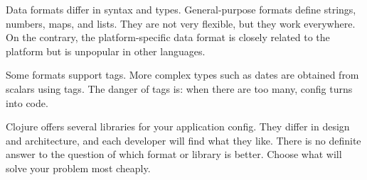 Data formats differ in syntax and types. General-purpose formats define strings, numbers, maps, and lists. They are not very flexible, but they work everywhere. On the contrary, the platform-specific data format is closely related to the platform but is unpopular in other languages.

Some formats support tags. More complex types such as dates are obtained from scalars using tags. The danger of tags is: when there are too many, config turns into code.

Clojure offers several libraries for your application config. They differ in design and architecture, and each developer will find what they like. There is no definite answer to the question of which format or library is better. Choose what will solve your problem most cheaply.
